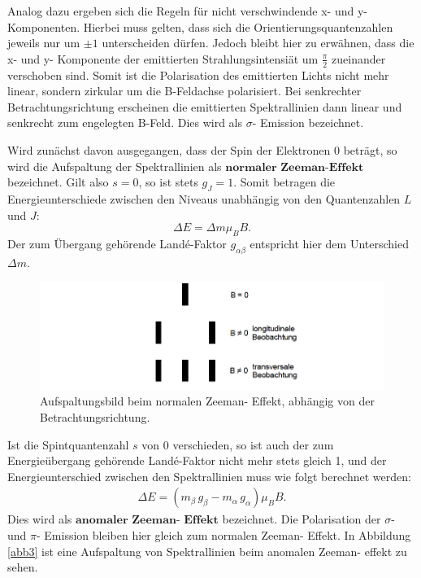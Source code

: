 \noindent Analog dazu ergeben sich die Regeln für nicht verschwindende x- und y- Komponenten.
Hierbei muss gelten, dass sich die Orientierungsquantenzahlen jeweils nur um
$\pm 1$ unterscheiden dürfen. Jedoch bleibt hier zu erwähnen, dass die x- und y- Komponente
der emittierten Strahlungsintensiät um $\frac{\pi}{2}$ zueinander verschoben sind.
Somit ist die Polarisation des emittierten Lichts nicht mehr linear, sondern zirkular
um die B-Feldachse polarisiert. Bei senkrechter Betrachtungsrichtung erscheinen die emittierten Spektrallinien
dann linear und senkrecht zum engelegten B-Feld.
Dies wird als $\sigma$- Emission bezeichnet.

\noindent Wird zunächst davon ausgegangen, dass der Spin der Elektronen 0 beträgt, so
wird die Aufspaltung der Spektrallinien als $\textbf{normaler Zeeman-Effekt}$ bezeichnet.
Gilt also $s=0$, so ist stets $g_J=1$. Somit betragen die Energieunterschiede zwischen
den Niveaus unabhängig von den Quantenzahlen $L$ und $J$:
\begin{equation}
	\Delta E = \Delta m \mu_{B} B.
\end{equation}
Der zum Übergang gehörende Landé-Faktor $g_{\alpha \beta}$ entspricht hier dem Unterschied
$\Delta m$.

\FloatBarrier
\begin{figure}
  \centering
  \includegraphics[scale=0.5]{normal2.PNG}
  \caption{Aufspaltungsbild beim normalen Zeeman- Effekt, abhängig von der Betrachtungsrichtung. \cite{Q1}}
  \label{abb2}
\end{figure}
\FloatBarrier

Ist die Spintquantenzahl $s$ von 0 verschieden, so ist auch der zum Energieübergang gehörende
Landé-Faktor nicht mehr stets gleich 1, und der Energieunterschied zwischen den Spektrallinien
muss wie folgt berechnet werden:
\begin{align*}
    \Delta E = (m_{\beta} \, g_{\beta} - m_{\alpha} \, g_{\alpha} )\mu_{B} B.
\end{align*}
Dies wird als $\textbf{anomaler Zeeman- Effekt}$ bezeichnet.
Die Polarisation der $\sigma$- und $\pi$- Emission bleiben hier gleich zum normalen
Zeeman- Effekt.
In Abbildung \ref{abb3} ist eine Aufspaltung von Spektrallinien beim anomalen Zeeman- effekt zu sehen.

